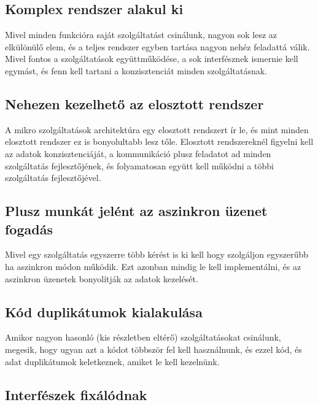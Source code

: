 \documentclass[11pt,magyar,a4paper,oneside,]{report}
\begin{document}
\subsection{Komplex rendszer alakul
ki}\label{komplex-rendszer-alakul-ki}

Mivel minden funkcióra saját szolgáltatást csinálunk, nagyon sok lesz az
elkülönülő elem, és a teljes rendszer egyben tartása nagyon nehéz
feladattá válik. Mivel fontos a szolgáltatások együttműködése, a sok
interfésznek ismernie kell egymást, és fenn kell tartani a
konzisztenciát minden szolgáltatásnak.

\subsection{Nehezen kezelhető az elosztott
rendszer}\label{nehezen-kezelhetux151-az-elosztott-rendszer}

A mikro szolgáltatások architektúra egy elosztott rendszert ír le, és
mint minden elosztott rendszer ez is bonyolultabb lesz tőle. Elosztott
rendszereknél figyelni kell az adatok konzisztenciáját, a kommunikáció
plusz feladatot ad minden szolgáltatás fejlesztőjének, és folyamatosan
együtt kell működni a többi szolgáltatás fejlesztőjével.

\subsection{Plusz munkát jelént az aszinkron üzenet
fogadás}\label{plusz-munkuxe1t-jeluxe9nt-az-aszinkron-uxfczenet-fogaduxe1s}

Mivel egy szolgáltatás egyszerre több kérést is ki kell hogy szolgáljon
egyszerűbb ha aszinkron módon működik. Ezt azonban mindig le kell
implementálni, és az aszinkron üzenetek bonyolítják az adatok kezelését.

\subsection{Kód duplikátumok
kialakulása}\label{kuxf3d-duplikuxe1tumok-kialakuluxe1sa}

Amikor nagyon hasonló (kis részletben eltérő) szolgáltatásokat
csinálunk, megesik, hogy ugyan azt a kódot többször fel kell
használnunk, és ezzel kód, és adat duplikátumok keletkeznek, amiket le
kell kezelnünk.

\subsection{Interfészek
fixálódnak}\label{interfuxe9szek-fixuxe1luxf3dnak}
\end{document}
